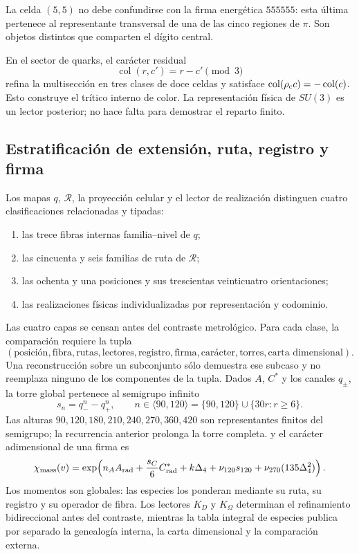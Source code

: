 La celda \((5,5)\) no debe confundirse con la firma energ\'etica
\(555555\): esta \'ultima pertenece al representante transversal de una de
las cinco regiones de \(\pi\). Son objetos distintos que comparten el d\'igito
central.

En el sector de quarks, el car\'acter residual
\[
 \operatorname{col}(r,c')=r-c'\pmod3
\]
refina la multisecci\'on en tres clases de doce celdas y satisface
\(\operatorname{col}(\rho_{\rm c} c)=-\operatorname{col}(c)\). Esto construye el
tr\'itico interno de color. La representaci\'on f\'isica de \(SU(3)\) es un
lector posterior; no hace falta para demostrar el reparto finito.

\subsection{Estratificación de extensión, ruta, registro y firma}

Los mapas \(q\), \(\mathcal R\), la proyecci\'on celular y el lector de
realizaci\'on distinguen cuatro clasificaciones relacionadas y tipadas:
\begin{enumerate}[label=(\roman*)]
 \item las trece fibras internas familia--nivel de \(q\);
 \item las cincuenta y seis familias de ruta de \(\mathcal R\);
 \item las ochenta y una posiciones y sus trescientas veinticuatro
       orientaciones;
 \item las realizaciones f\'isicas individualizadas por representaci\'on y codominio.
\end{enumerate}
Las cuatro capas se censan antes del contraste metrol\'ogico. Para cada clase,
la comparación requiere la tupla
\[
(\text{posici\'on},\text{fibra},\text{rutas},\text{lectores},
\text{registro},\text{firma},\text{car\'acter},\text{torres},
\text{carta dimensional}).
\]
Una reconstrucci\'on sobre un subconjunto sólo demuestra ese subcaso y no
reemplaza ninguno de los componentes de la tupla.
Dados \(A\), \(C^*\) y los canales \(q_\pm\), la torre global pertenece al
semigrupo infinito
\[
 s_n=q_-^n-q_+^n,
 \qquad
 n\in\langle90,120\rangle
 =\{90,120\}\cup\{30r:r\geq6\}.
\]
Las alturas \(90,120,180,210,240,270,360,420\) son representantes finitos del
semigrupo; la recurrencia anterior prolonga la torre completa.
y el car\'acter adimensional de una firma es
\[
 \chi_{\rm mass}(v)=\exp\!\left(
 n_AA_{\rm rad}+\frac{s_C}{6}C^*_{\rm rad}
 +k\Delta_4+\nu_{120}s_{120}+\nu_{270}(135\Delta_4^2)
 \right).
\]
Los momentos son globales: las especies los ponderan mediante su ruta, su
registro y su operador de fibra. Los lectores \(K_D\) y \(K_\Omega\)
determinan el refinamiento bidireccional antes del contraste, mientras la
tabla integral de especies publica por separado la genealogía interna, la
carta dimensional y la comparación externa.

